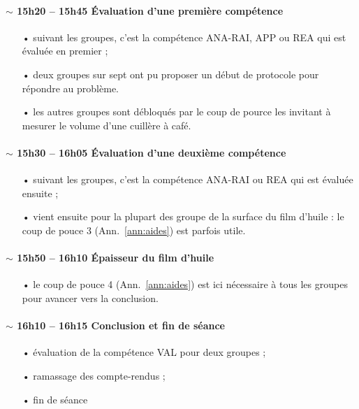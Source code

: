 \documentclass[12pt,a4paper, fleqn]{article}
\newcommand{\app}{\colorbox{bleu_c}{\textcolor{bleu_f}{APP}}}
\newcommand{\rea}{\colorbox{yellow_c}{\textcolor{yellow_f}{REA}}}
\newcommand{\anarai}{\colorbox{green_c}{\textcolor{green_f}{ANA-RAI}}}
\newcommand{\val}{\colorbox{orange_c}{\textcolor{orange_f}{VAL}}}
\begin{document}
\paragraph{$\sim$ 15h20 -- 15h45 Évaluation d'une première compétence}
\begin{itemize}
\item[•] suivant les groupes, c'est la compétence \anarai{}, \app{} ou \rea{} qui est évaluée en premier ;
\item[•] deux groupes sur sept ont pu proposer un début de protocole pour répondre au problème.
\item[•] les autres groupes sont débloqués par le coup de pource les invitant à mesurer le volume d'une cuillère à café.
\end{itemize}

\paragraph{$\sim$ 15h30 -- 16h05 Évaluation d'une deuxième compétence}
\begin{itemize}
\item[•] suivant les groupes, c'est la compétence \anarai{} ou \rea{} qui est évaluée ensuite ;
\item[•] vient ensuite pour la plupart des groupe de la surface du film d'huile : le coup de pouce 3 (Ann.~\ref{ann:aides}) est parfois utile.
\end{itemize}

\paragraph{$\sim$ 15h50 -- 16h10 Épaisseur du film d'huile}
\begin{itemize}
\item[•] le coup de pouce 4 (Ann.~\ref{ann:aides}) est ici nécessaire à tous les groupes pour avancer vers la conclusion.
\end{itemize}

\paragraph{$\sim$ 16h10 -- 16h15 Conclusion et fin de séance}
\begin{itemize}
\item[•] évaluation de la compétence \val{} pour deux groupes ;
\item[•] ramassage des compte-rendus ;
\item[•] fin de séance
\end{itemize}
\end{document}
